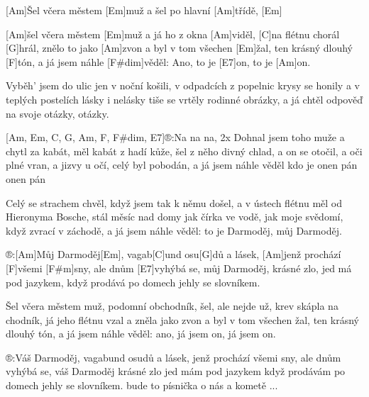 
[Am]\null Šel včera městem [Em]muž 
a šel po hlavní [Am]třídě, [Em]

[Am]\null šel včera městem [Em]muž 
a já ho z okna [Am]viděl,
[C]na flétnu chorál [G]hrál, 
znělo to jako [Am]zvon
a byl v tom všechen [Em]\null žal, 
ten krásný dlouhý [F]tón,
a já jsem náhle [F#dim]věděl: 
Ano, to je [E7]on, to je [Am]on.

Vyběh' jsem do ulic jen v noční košili,
v odpadcích z popelnic krysy se honily
a v teplých postelích lásky i nelásky
tiše se vrtěly rodinné obrázky,
a já chtěl odpověď na svoje otázky, otázky.

[Am, Em, C, G, Am, F, F#dim, E7]\null®:Na na na, 2x
Dohnal jsem toho muže a chytl za kabát,
měl kabát z hadí kůže, šel z něho divný chlad,
a on se otočil, a oči plné vran,
a jizvy u očí, celý byl pobodán,
a já jsem náhle věděl kdo je onen pán onen pán

Celý se strachem chvěl, 
když jsem tak k němu došel,
a v ústech flétnu měl od Hieronyma Bosche,
stál měsíc nad domy jak čírka ve vodě,
jak moje svědomí, když zvrací v záchodě,
a já jsem náhle věděl: 
to je Darmoděj, můj Darmoděj.

®:[Am]Můj Darmoděj[Em], 
vagab[C]und osu[G]dů a lásek,
[Am]jenž prochází [F]všemi [F#m]sny, 
ale dnům [E7]vyhýbá se,
můj Darmoděj, krásné zlo, 
jed má pod jazykem,
když prodává po domech jehly se slovníkem.

Šel včera městem muž, podomní obchodník,
šel, ale nejde už, krev skápla na chodník,
já jeho flétnu vzal a zněla jako zvon
a byl v tom všechen žal, ten krásný dlouhý tón,
a já jsem náhle věděl: 
ano, já jsem on, já jsem on.

®:Váš Darmoděj, vagabund osudů a lásek,
jenž prochází všemi sny, ale dnům vyhýbá se,
váš Darmoděj krásné zlo jed mám pod jazykem
když prodávám po domech jehly se slovníkem.
bude to písnička o nás a kometě ...